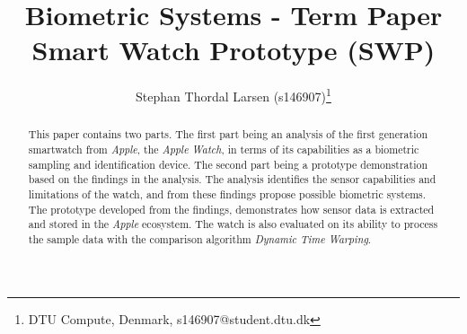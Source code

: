 \documentclass[english]{lni}
\author{Stephan Thordal Larsen (s146907)\footnote{DTU Compute, Denmark,
s146907@student.dtu.dk}}
\title{Biometric Systems - Term Paper \\ Smart Watch Prototype (SWP)}
\renewcommand{\headrulewidth}{0.4pt} %
\begin{document}
\maketitle

\renewcommand{\refname}{References}
\setcounter{footnote}{1} %

\begin{abstract}
This paper contains two parts. The first part being an analysis of the first generation 
smartwatch from \textit{Apple}, the \textit{Apple Watch}, in terms of its
capabilities as a biometric sampling and identification device. The second part
being a prototype demonstration based on the findings in the analysis. 
The analysis identifies the sensor capabilities and limitations of the watch, 
and from these findings propose possible biometric systems. 
The prototype developed from the findings, demonstrates how sensor data is
extracted and stored in the \textit{Apple} ecosystem. The watch is also
evaluated on its ability to process the sample data with the comparison
algorithm \textit{Dynamic Time Warping}. 
\end{abstract}



\clearpage
\pagestyle{fancy}
\fancyhead{} %
\fancyfoot{} %
\renewcommand{\headrulewidth}{0.4pt} %





%

\end{document}

